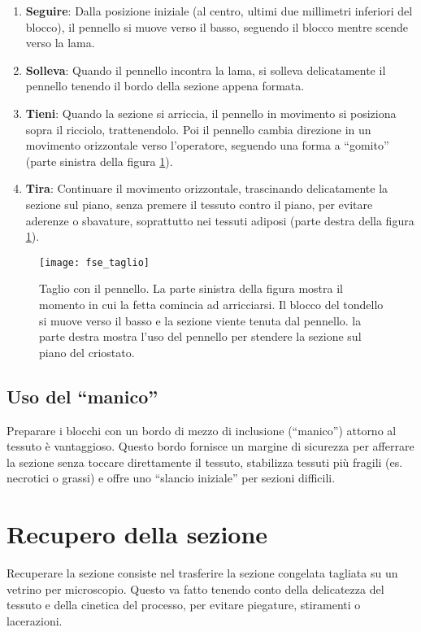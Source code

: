 \begin{enumerate}
\item \textbf{Seguire}: Dalla posizione iniziale (al centro, ultimi due millimetri inferiori del blocco), il pennello si muove verso il basso, seguendo il blocco mentre scende verso la lama.
\item \textbf{Solleva}: Quando il pennello incontra la lama, si solleva delicatamente il pennello tenendo il bordo della sezione appena formata.
\item \textbf{Tieni}: Quando la sezione si arriccia, il pennello in movimento si posiziona sopra il ricciolo, trattenendolo. Poi il pennello cambia direzione in un movimento orizzontale verso l'operatore, seguendo una forma a “gomito” (parte sinistra della figura \ref{fig:fse_taglio}).
\item \textbf{Tira}: Continuare il movimento orizzontale, trascinando delicatamente la sezione sul piano, senza premere il tessuto contro il piano, per evitare aderenze o sbavature, soprattutto nei tessuti adiposi (parte destra della figura \ref{fig:fse_taglio}).
\end{enumerate}

\begin{figure}[htbp]
    \centering
    \texttt{[image: fse\_taglio]}
    \caption{Taglio con il pennello. La parte sinistra della figura mostra il momento in cui la fetta comincia ad arricciarsi. Il blocco del tondello si muove verso il basso e la sezione viente tenuta dal pennello. la parte destra mostra l'uso del pennello per stendere la sezione sul piano del criostato.}
    \label{fig:fse_taglio}
\end{figure}

\subsection{Uso del ``manico''} 
Preparare i blocchi con un bordo di mezzo di inclusione (``manico'') attorno al tessuto è vantaggioso. Questo bordo fornisce un margine di sicurezza per afferrare la sezione senza toccare direttamente il tessuto, stabilizza tessuti più fragili (es. necrotici o grassi) e offre uno ``slancio iniziale'' per sezioni difficili.

\section{Recupero della sezione}
Recuperare la sezione consiste nel trasferire la sezione congelata tagliata su un vetrino per microscopio. Questo va fatto tenendo conto della delicatezza del tessuto e della cinetica del processo, per evitare piegature, stiramenti o lacerazioni.

